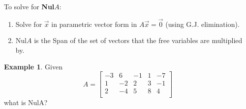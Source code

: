 \documentclass[a4paper,12pt]{article}
\theoremstyle{definition}
\theoremstyle{definition}
\newtheorem{example}{Example}[subsection]
\newcommand{\mateq}[3]{#1#2 = #3}
\newcommand{\mateqaxo}{\mateq{A}{\vec{x}}{\vec{0}}}
\begin{document}
	To solve for \textbf{Nul}$A$:
	\begin{enumerate}
		\item Solve for $\vec{x}$ in parametric vector form in $\mateqaxo$ (using G.J. elimination).
		
		\item Nul$A$ is the Span of the set of vectors that the free variables are multiplied by.
	\end{enumerate}
	
	\begin{example}
		Given
		\begin{equation*}
			A =
			\begin{bmatrix}
				-3 & 6 & -1 & 1 & -7\\
				1 & -2 & 2 & 3 & -1\\
				2 & -4 & 5 & 8 & 4\\
			\end{bmatrix}
		\end{equation*}
		what is NulA?
		

\end{example}
\end{document}
